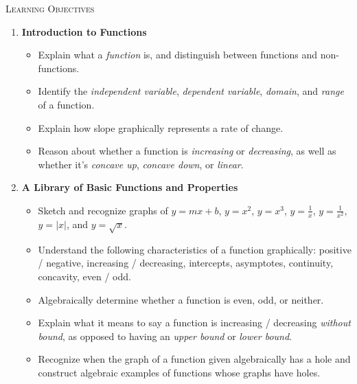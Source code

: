 \documentclass{article}
\begin{document}
\begin{center}
  \Large\textsc{Learning Objectives}
\end{center}

\begin{enumerate}
\item \textbf{Introduction to Functions} %
  \begin{itemize}

  \item Explain what a \emph{function} is, and distinguish between functions and non-functions.

  \item Identify the \emph{independent variable}, \emph{dependent variable}, \emph{domain}, and \emph{range} of a function.

  \item Explain how slope graphically represents a rate of change.

  \item Reason about whether a function is \emph{increasing} or \emph{decreasing}, as well as whether it's \emph{concave up}, \emph{concave down}, or \emph{linear}.

  \end{itemize}

\item \textbf{A Library of Basic Functions and Properties} %
  \begin{itemize}
  \item Sketch and recognize graphs of $y = mx + b$, $y = x^2$, $y = x^3$, $y = \frac{1}{x}$, $y = \frac{1}{x^2}$, $y = |x|$, and $y = \sqrt{x}$.

  \item Understand the following characteristics of a function graphically: positive / negative, increasing / decreasing, intercepts, asymptotes, continuity, concavity, even / odd.

  \item Algebraically determine whether a function is even, odd, or neither.

  \item Explain what it means to say a function is increasing / decreasing \emph{without bound}, as opposed to having an \emph{upper bound} or \emph{lower bound}.

  \item Recognize when the graph of a function given algebraically has a hole and construct algebraic examples of functions whose graphs have holes.

  \end{itemize}


\end{enumerate}
\end{document}
